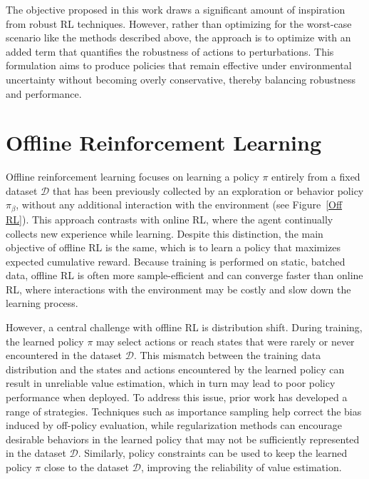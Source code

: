 \documentclass[./dissertation.tex]{subfiles}
\begin{document}
The objective proposed in this work draws a significant amount of inspiration from robust RL techniques. However, rather than optimizing for the worst-case scenario like the methods described above, the approach is to optimize with an added term that quantifies the robustness of actions to perturbations. This formulation aims to produce policies that remain effective under environmental uncertainty without becoming overly conservative, thereby balancing robustness and performance.

\section{Offline Reinforcement Learning}
\label{OFF RL}
Offline reinforcement learning \parencite{OfflineRLSurvey} focuses on learning a policy $\pi$ entirely from a fixed dataset $\mathcal{D}$ that has been previously collected by an exploration or behavior policy $\pi_\beta$, without any additional interaction with the environment (see Figure~\ref{Off RL}). This approach contrasts with online RL, where the agent continually collects new experience while learning. Despite this distinction, the main objective of offline RL is the same, which is to learn a policy that maximizes expected cumulative reward. Because training is performed on static, batched data, offline RL is often more sample-efficient and can converge faster than online RL, where interactions with the environment may be costly and slow down the learning process. 

However, a central challenge with offline RL is distribution shift. During training, the learned policy $\pi$ may select actions or reach states that were rarely or never encountered in the dataset $\mathcal{D}$. This mismatch between the training data distribution and the states and actions encountered by the learned policy can result in unreliable value estimation, which in turn may lead to poor policy performance when deployed. To address this issue, prior work has developed a range of strategies. Techniques such as importance sampling \parencite{IS} help correct the bias induced by off-policy evaluation, while regularization methods \parencite{Offline2} can encourage desirable behaviors in the learned policy that may not be sufficiently represented in the dataset $\mathcal{D}$. Similarly, policy constraints \parencite{Offline1} can be used to keep the learned policy $\pi$ close to the dataset $\mathcal{D}$, improving the reliability of value estimation. 
\end{document}
